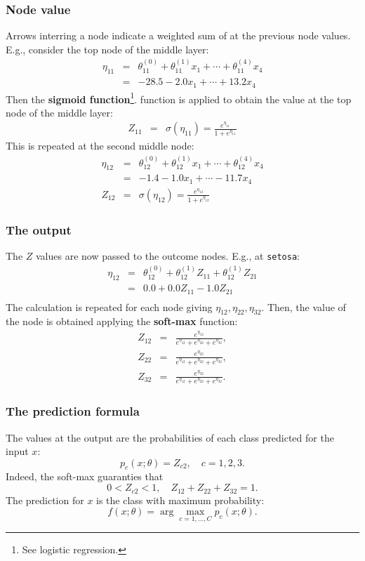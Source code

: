 \begin{frame}
\frametitle{Node value}
Arrows interring a node indicate a weighted sum of at the previous node values. E.g., consider the top node of the middle layer:
\begin{eqnarray*}
\eta_{11} &=& \theta_{11}^{(0)} + \theta_{11}^{(1)} x_1 + \cdots + \theta_{11}^{(4)} x_4\\
&=& -28.5 -2.0 x_1 + \cdots + 13.2 x_4
\end{eqnarray*}
Then the {\bf sigmoid function}\footnote{See logistic regression.}. function is applied to obtain the value at the top node of the middle layer:
\begin{eqnarray*}
Z_{11} &=& \sigma(\eta_{11}) = \frac{e^{\eta_{11}}}{1+e^{\eta_{11}}}
\end{eqnarray*}
This is repeated at the second middle node:
\begin{eqnarray*}
\eta_{12} &=& \theta_{12}^{(0)} + \theta_{12}^{(1)} x_1 + \cdots + \theta_{12}^{(4)} x_4\\
&=& -1.4 -1.0 x_1 + \cdots - 11.7 x_4\\
Z_{12} &=& \sigma(\eta_{12}) = \frac{e^{\eta_{12}}}{1+e^{\eta_{12}}}
\end{eqnarray*}
\end{frame}
\begin{frame}
\frametitle{The output}
The $Z$ values are now passed to the outcome nodes. E.g., at {\tt setosa}:
\begin{eqnarray*}
\eta_{12} &=& \theta_{12}^{(0)} + \theta_{12}^{(1)} Z_{11} + \theta_{12}^{(1)} Z_{21} \\
 &=& 0.0 + 0.0 Z_{11} - 1.0 Z_{21} \\
\end{eqnarray*}
The calculation is repeated for each node giving $\eta_{12}, \eta_{22}, \eta_{32}$. Then, the value of the node is obtained applying the {\bf soft-max} function:
\begin{eqnarray*}
Z_{12} &=& \frac{e^{\eta_{12}}}{e^{\eta_{12}}+e^{\eta_{22}}+e^{\eta_{32}}},\\
Z_{22} &=& \frac{e^{\eta_{22}}}{e^{\eta_{12}}+e^{\eta_{22}}+e^{\eta_{32}}},\\
Z_{32} &=& \frac{e^{\eta_{32}}}{e^{\eta_{12}}+e^{\eta_{22}}+e^{\eta_{32}}}.
\end{eqnarray*}
\end{frame}
\begin{frame}
\frametitle{The prediction formula}
The values at the output are the probabilities of each class predicted for the input $x$:
$$
p_c(x;\theta) = Z_{c2}, \quad c=1,2,3.
$$
Indeed, the soft-max guaranties that
$$
0 < Z_{c2} < 1, \quad Z_{12}+Z_{22}+Z_{32} = 1.
$$
The prediction for $x$ is the class with maximum probability:
$$
f(x;\theta) = \arg \max_{c=1,\ldots,C} p_c(x;\theta).
$$
\end{frame}
